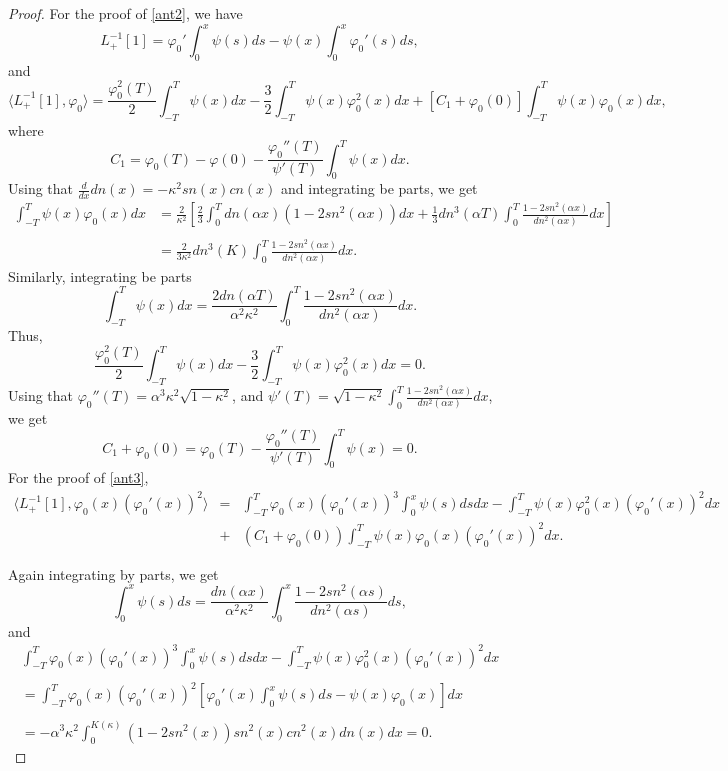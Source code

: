 \documentclass[12pt]{amsart}
\theoremstyle{definition}
\theoremstyle{remark}
\numberwithin{equation}{section}
\renewcommand{\(}{\left(}
\renewcommand{\)}{\right)}
\renewcommand{\[}{\left[}
\renewcommand{\]}{\right]}
\newcommand{\vp}{\varphi}
\newcommand{\dpr}[2]{\langle #1,#2 \rangle}
\begin{document}
\begin{proof}
              For the proof of \eqref{ant2},  we have
             $$L_+^{-1}[1]=\varphi_0'\int_{0}^{x}\psi (s) ds-\psi (x)\int_{0}^{x}\varphi_0'(s)ds, $$
             and
             $$\dpr{L_+^{-1} [1]} {\vp_0}=\frac{\varphi_0^2(T)}{2}\int_{-T}^{T}{\psi(x)}dx-\frac{3}{2}\int_{-T}^{T}{\psi(x)\varphi_0^2(x)}dx+[C_1+\varphi_0(0)]\int_{-T}^{T}{\psi(x)\varphi_0(x)}dx,$$
             where$$C_1=\varphi_0(T)-\varphi (0)-\frac{\varphi_0''(T)}{\psi'(T)}\int_{0}^{T}{\psi(x)}dx.$$
             Using that $\frac{d}{dx} dn(x)=-\kappa^2sn(x)cn(x)$ and integrating be parts, we get  
             $$\begin{array}{ll}
             \int_{-T}^{T}{\psi(x)\varphi_0(x)}dx & =\frac{2}{\kappa^2} \left[ \frac{2}{3}\int_{0}^{T}{dn(\alpha x)(1-2sn^2(\alpha x))}dx+\frac{1}{3}dn^3(\alpha T)\int_{0}^{T}{\frac{1-2sn^2(\alpha x)}{dn^2(\alpha x)}}dx\right] \\
             \\
              & =\frac{2}{3\kappa^2}dn^3(K)\int_{0}^{T}{\frac{1-2sn^2(\alpha x)}{dn^2(\alpha x)}}dx.
             \end{array} $$
             Similarly, integrating be parts
               $$\int_{-T}^{T}{\psi(x)}dx=\frac{2dn(\alpha T)}{\alpha^2\kappa^2}\int_{0}^{T}{\frac{1-2sn^2(\alpha x)}{dn^2(\alpha x)}}dx.$$
               Thus,
             $$
             \frac{\varphi_0^2(T)}{2}\int_{-T}^{T}{\psi(x)}dx-\frac{3}{2}\int_{-T}^{T}{\psi(x)\varphi_0^2(x)}dx=0.
             $$
             Using that $\varphi_0''(T)=\alpha^3\kappa^2\sqrt{1-\kappa^2}$, and $\psi'(T)=\sqrt{1-\kappa^2}\int_{0}^{T}{\frac{1-2sn^2(\alpha x)}{dn^2(\alpha x)}}dx$, we get
             $$
             C_1+\varphi_0(0)=\varphi_0(T)-\frac{\varphi_0''(T)}{\psi'(T)}\int_{0}^{T}{\psi(x)}=0.
             $$
             For the proof of \eqref{ant3},
            \begin{eqnarray*}
      \dpr{L_+^{-1} [1]} {\vp_0(x)(\varphi_0'(x))^2} &=& \int_{-T}^{T}{\varphi_0(x)(\varphi_0'(x))^3\int_{0}^{x}{\psi(s)}ds}dx-
      \int_{-T}^{T}{\psi(x)\varphi_0^2(x)(\varphi_0'(x))^2}dx\\
        	& + & (C_1+\varphi_0(0))\int_{-T}^{T}{\psi(x)\varphi_0(x)(\varphi_0'(x))^2}dx.
            \end{eqnarray*}

             Again integrating by parts, we get 
             $$\int_{0}^{x}{\psi(s)}ds=\frac{dn(\alpha x)}{\alpha^2 \kappa^2}\int_{0}^{x}{\frac{1-2sn^2(\alpha s)}{dn^2(\alpha s)}}ds,$$
              and
             $$
             \begin{array}{ll}
             \int_{-T}^{T}{\varphi_0(x)(\varphi_0'(x))^3\int_{0}^{x}{\psi(s)}ds}dx-\int_{-T}^{T}{\psi(x)\varphi_0^2(x)(\varphi_0'(x))^2}dx\\
             \\
             =\int_{-T}^{T}{\varphi_0(x)(\varphi_0'(x))^2\left[ \varphi_0'(x)\int_{0}^{x}{\psi(s)}ds-\psi(x)\varphi_0(x)\right]}dx \\
             \\
             =-\alpha^3\kappa^2\int_{0}^{K(\kappa)}{(1-2sn^2(x))sn^2(x)cn^2(x)dn(x)}dx=0.
             \end{array} $$


\end{proof}
\end{document}
